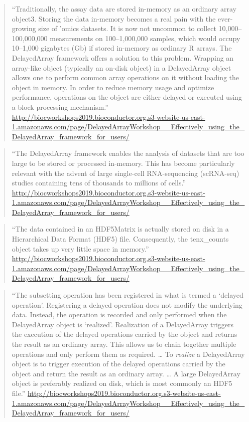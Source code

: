 \documentclass[]{tufte-book}
\begin{document}
\begin{quote}
``Traditionally, the assay data are stored in-memory as an ordinary array object3. Storing the data in-memory becomes a real pain with the ever-growing size of 'omics datasets. It is now not uncommon to collect 10,000--100,000,000 measurements on 100--1,000,000 samples, which would occupy 10--1,000 gigabytes (Gb) if stored in-memory as ordinary R arrays.
The DelayedArray framework offers a solution to this problem. Wrapping an array-like object (typically an on-disk object) in a DelayedArray object allows one to perform common array operations on it without loading the object in memory. In order to reduce memory usage and optimize performance, operations on the object are either delayed or executed using a block processing mechanism.'' \url{http://biocworkshops2019.bioconductor.org.s3-website-us-east-1.amazonaws.com/page/DelayedArrayWorkshop__Effectively_using_the_DelayedArray_framework_for_users/}
\end{quote}

\begin{quote}
``The DelayedArray framework enables the analysis of datasets that are too large to be stored or processed in-memory. This has become particularly relevant with the advent of large single-cell RNA-sequencing (scRNA-seq) studies containing tens of thousands to millions of cells.'' \url{http://biocworkshops2019.bioconductor.org.s3-website-us-east-1.amazonaws.com/page/DelayedArrayWorkshop__Effectively_using_the_DelayedArray_framework_for_users/}
\end{quote}

\begin{quote}
``The data contained in an HDF5Matrix is actually stored on disk in a Hierarchical Data Format (HDF5) file. Consequently, the tenx\_counts object takes up very little space in memory.'' \url{http://biocworkshops2019.bioconductor.org.s3-website-us-east-1.amazonaws.com/page/DelayedArrayWorkshop__Effectively_using_the_DelayedArray_framework_for_users/}
\end{quote}

\begin{quote}
``The subsetting operation has been registered in what is termed a `delayed operation'. Registering a delayed operation does not modify the underlying data. Instead, the operation is recorded and only performed when the DelayedArray object is `realized'. Realization of a DelayedArray triggers the execution of the delayed operations carried by the object and returns the result as an ordinary array.
This allows us to chain together multiple operations and only perform them as required. \ldots{} To \emph{realize} a DelayedArray object is to trigger execution of the delayed operations carried by the object and return the result as an ordinary array. \ldots{} A large DelayedArray object is preferably realized on disk, which is most commonly an HDF5 file.'' \url{http://biocworkshops2019.bioconductor.org.s3-website-us-east-1.amazonaws.com/page/DelayedArrayWorkshop__Effectively_using_the_DelayedArray_framework_for_users/}
\end{quote}
\end{document}
